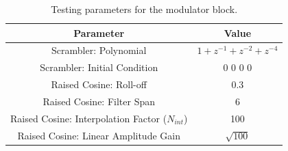 \documentclass[12pt,a4paper]{report}
\begin{document}
\begin{table}[h]
    \centering
    \begin{tabular}{c|c}
        Parameter & Value \\ \hline
        Scrambler: Polynomial & $1 + z^{-1} + z^{-2} + z^{-4}$ \\
        Scrambler: Initial Condition & 0 0 0 0 \\
        \hline
        Raised Cosine: Roll-off & 0.3 \\
        Raised Cosine: Filter Span & 6 \\
        Raised Cosine: Interpolation Factor ($N_{int}$) & 100 \\
        Raised Cosine: Linear Amplitude Gain & $\sqrt{100}$ \\
    \end{tabular}
    \caption{Testing parameters for the modulator block.}
    \label{tab:parameters:modulator}
\end{table}
\end{document}
